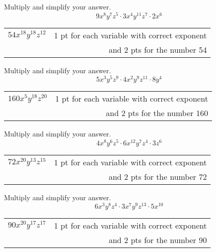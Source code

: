 {
	Multiply and simplify your answer. 
	$$9x^8 y^7 z^5 \cdot 3x^4 y^{11} z^7\cdot 2x^6$$
}
{
	\begin{tabular}{l r}
	$54 x^{18} y^{18}z^{12}$ & 1 pt for each variable with correct exponent\\ & and 2 pts for the number 54
	\end{tabular}
}

{
	Multiply and simplify your answer. 
	$$5x^3 y^5 z^9 \cdot 4x^2 y^{9} z^{11}\cdot 8y^4$$
}
{
	\begin{tabular}{l r}
	$160 x^{5} y^{18}z^{20}$ & 1 pt for each variable with correct exponent\\ & and 2 pts for the number 160
	\end{tabular}
}
{
	Multiply and simplify your answer. 
	$$4x^8 y^6 z^5 \cdot 6x^{12} y^{7} z^4\cdot 3z^6$$
}
{
	\begin{tabular}{l r}
	$72 x^{20} y^{13}z^{15}$ & 1 pt for each variable with correct exponent\\ & and 2 pts for the number 72
	\end{tabular}
}
{
	Multiply and simplify your answer. 
	$$6x^3 y^8 z^4 \cdot 3x^7 y^{9} z^{13}\cdot 5x^{10}$$
}
{
	\begin{tabular}{l r}
	$90 x^{20} y^{17}z^{17}$ & 1 pt for each variable with correct exponent\\ & and 2 pts for the number 90
	\end{tabular}
}